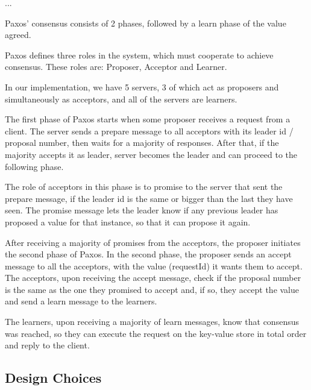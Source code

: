 \documentclass[times, 10pt,twocolumn]{article}
\begin{document}
...

Paxos' consensus consists of 2 phases,
followed by a learn phase of the value agreed.


Paxos defines three roles in the system, which must cooperate to achieve
consensus. These roles are: Proposer, Acceptor and Learner.

In our implementation, we have 5 servers, 3 of which act as proposers and
simultaneously as acceptors, and all of the servers are learners. 


The first phase of Paxos starts when some proposer receives a request
from a client. The server sends a prepare message to all acceptors with
its leader id / proposal number, then waits for a majority of responses. After that,
if the majority accepts it as leader, server becomes the leader and
can proceed to the following phase.

The role of acceptors in this phase is to promise to the server
that sent the prepare message, if the leader id is the same or
bigger than the last they have seen. The promise message lets the
leader know if any previous leader has proposed a value
for that instance, so that it can propose it again.


After receiving a majority of promises from the acceptors, the proposer 
initiates the second phase of Paxos. In the second phase, the proposer 
sends an accept message to all the acceptors, with the value (requestId) 
it wants them to accept. The acceptors, upon receiving the accept message,
check if the proposal number is the same as the one they promised to accept
and, if so, they accept the value and send a learn message to the learners.



The learners, upon receiving a majority of learn
messages, know that consensus was reached, so they can execute
the request on the key-value store in total order and reply to the client.

\subsection{Design Choices}

\end{document}
